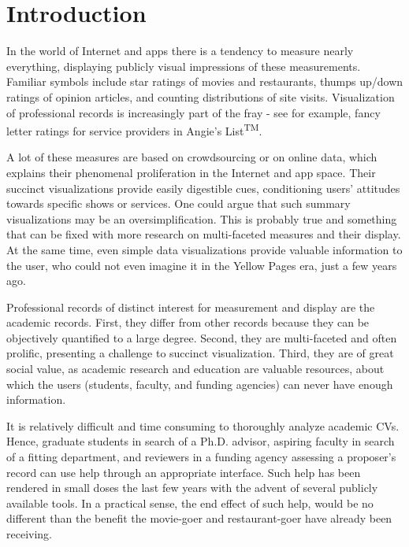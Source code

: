 \chapter{Introduction}\label{chap:Intro}

In the world of Internet and apps there is a tendency to measure nearly everything, displaying publicly visual impressions of these measurements. Familiar symbols include star ratings of movies and restaurants, thumps up/down ratings of opinion articles, and counting distributions of site visits. Visualization of professional records is increasingly part of the fray - see for example, fancy letter ratings for service providers in Angie's List\textsuperscript{TM}. 

A lot of these measures are based on crowdsourcing or on online data, which explains their phenomenal proliferation in the Internet and app space. Their succinct visualizations provide easily digestible cues, conditioning users' attitudes towards specific shows or services. One could argue that such summary visualizations may be an oversimplification. This is probably true and something that can be  fixed with more research on multi-faceted measures and their display. At the same time, even simple data visualizations provide valuable information to the user, who could not even imagine it in the Yellow Pages era, just a few years ago. 

Professional records of distinct interest for measurement and display are the academic records. First, they differ from other records because they can be objectively quantified to a large degree. Second, they are multi-faceted and often prolific, presenting a challenge to succinct visualization. Third, they are of great social value, as academic research and education are valuable resources, about which the users (students, faculty, and funding agencies) can never have enough information.

It is relatively difficult and time consuming to thoroughly analyze academic CVs. Hence, graduate students in search of a Ph.D. advisor, aspiring faculty in search of a fitting department, and reviewers in a funding agency assessing a proposer's record can use help through an appropriate interface. Such help has been rendered in small doses the last few years with the advent of several publicly available tools. In a practical sense, the end effect of such help, would be no different than the benefit the movie-goer and restaurant-goer have already been receiving.

